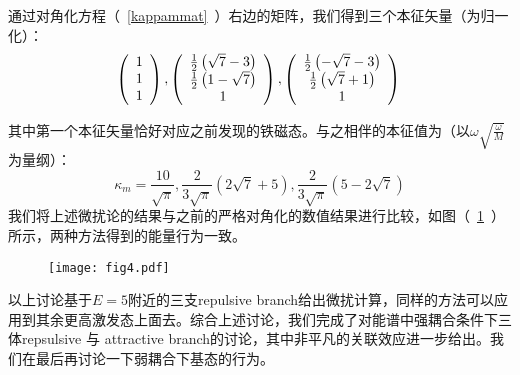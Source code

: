 通过对角化方程（~\ref{kappammat}~）右边的矩阵，我们得到三个本征矢量（为归一化）：
\begin{equation}
        \left(
            \begin{array}{c}
            1\\
            1\\
            1\\
            \end{array}
        \right),
        \left(
            \begin{array}{c}
            \frac{1}{2} \left(\sqrt{7}-3\right)\\
            \frac{1}{2} \left(1-\sqrt{7}\right)\\
            1\\
            \end{array}
        \right),
        \left(
            \begin{array}{c}
            \frac{1}{2} \left(-\sqrt{7}-3\right)\\
            \frac{1}{2} \left(\sqrt{7}+1\right)\\
            1\\
            \end{array}
        \right)\\
\end{equation}

其中第一个本征矢量恰好对应之前发现的铁磁态。与之相伴的本征值为（以$ \omega \sqrt{\frac{\omega}{M}}$为量纲）：
\begin{equation}
\kappa_m= \frac{10}{\sqrt{\pi}},\frac{2}{3\sqrt{\pi}} \left(2 \sqrt{7}+5\right),\frac{2}{3\sqrt{\pi}} \left(5-2 \sqrt{7}\right) 
\end{equation}
我们将上述微扰论的结果与之前的严格对角化的数值结果进行比较，如图（~\ref{fig:fig4}~）所示，两种方法得到的能量行为一致。
\begin{figure}[!htbp]
    \centering
    \texttt{[image: fig4.pdf]}
    \label{fig:fig4}
\end{figure}
以上讨论基于$E=5$附近的三支repulsive branch给出微扰计算，同样的方法可以应用到其余更高激发态上面去。综合上述讨论，我们完成了对能谱中强耦合条件下三体repsulsive 与 attractive branch的讨论，其中非平凡的关联效应进一步给出。我们在最后再讨论一下弱耦合下基态的行为。

